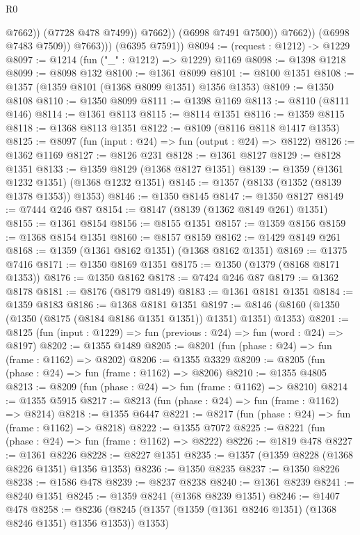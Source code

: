 \begin{lexlean}{R0}
\begin{coremodule}
                              @7662))
                          (@7728 @478 @7499))
                        @7662))
                    (@6998 @7491 @7500))
                  @7662))
              (@6998 @7483 @7509))
            @7663)))
      (@6395 @7591))
@8094 := (request : @1212) -> @1229
@8097 := @1214 (fun ("_" : @1212) => @1229) @1169
@8098 := @1398 @1218
@8099 := @8098 @132
@8100 := @1361 @8099
@8101 := @8100 @1351
@8108 := @1357 (@1359 @8101 (@1368 @8099 @1351) @1356 @1353)
@8109 := @1350 @8108
@8110 := @1350 @8099
@8111 := @1398 @1169
@8113 := @8110 (@8111 @146)
@8114 := @1361 @8113
@8115 := @8114 @1351
@8116 := @1359 @8115
@8118 := @1368 @8113 @1351
@8122 := @8109 (@8116 @8118 @1417 @1353)
@8125 := @8097 (fun (input : @24) => fun (output : @24) => @8122)
@8126 := @1362 @1169
@8127 := @8126 @231
@8128 := @1361 @8127
@8129 := @8128 @1351
@8133 := @1359 @8129 (@1368 @8127 @1351)
@8139 := @1359 (@1361 @1232 @1351) (@1368 @1232 @1351)
@8145 := @1357 (@8133 (@1352 (@8139 @1378 @1353)) @1353)
@8146 := @1350 @8145
@8147 := @1350 @8127
@8149 := @7444 @246 @87
@8154 := @8147 (@8139 (@1362 @8149 @261) @1351)
@8155 := @1361 @8154
@8156 := @8155 @1351
@8157 := @1359 @8156
@8159 := @1368 @8154 @1351
@8160 := @8157 @8159
@8162 := @1429 @8149 @261
@8168 := @1359 (@1361 @8162 @1351) (@1368 @8162 @1351)
@8169 := @1375 @7416
@8171 := @1350 @8169 @1351
@8175 := @1350 (@1379 (@8168 @8171 @1353))
@8176 := @1350 @8162
@8178 := @7424 @246 @87
@8179 := @1362 @8178
@8181 := @8176 (@8179 @8149)
@8183 := @1361 @8181 @1351
@8184 := @1359 @8183
@8186 := @1368 @8181 @1351
@8197 := @8146 (@8160 (@1350 (@1350 (@8175 (@8184 @8186 @1351 @1351)) @1351) @1351) @1353)
@8201 := @8125 (fun (input : @1229) => fun (previous : @24) => fun (word : @24) => @8197)
@8202 := @1355 @1489
@8205 := @8201 (fun (phase : @24) => fun (frame : @1162) => @8202)
@8206 := @1355 @3329
@8209 := @8205 (fun (phase : @24) => fun (frame : @1162) => @8206)
@8210 := @1355 @4805
@8213 := @8209 (fun (phase : @24) => fun (frame : @1162) => @8210)
@8214 := @1355 @5915
@8217 := @8213 (fun (phase : @24) => fun (frame : @1162) => @8214)
@8218 := @1355 @6447
@8221 := @8217 (fun (phase : @24) => fun (frame : @1162) => @8218)
@8222 := @1355 @7072
@8225 := @8221 (fun (phase : @24) => fun (frame : @1162) => @8222)
@8226 := @1819 @478
@8227 := @1361 @8226
@8228 := @8227 @1351
@8235 := @1357 (@1359 @8228 (@1368 @8226 @1351) @1356 @1353)
@8236 := @1350 @8235
@8237 := @1350 @8226
@8238 := @1586 @478
@8239 := @8237 @8238
@8240 := @1361 @8239
@8241 := @8240 @1351
@8245 := @1359 @8241 (@1368 @8239 @1351)
@8246 := @1407 @478
@8258 := @8236 (@8245 (@1357 (@1359 (@1361 @8246 @1351) (@1368 @8246 @1351) @1356 @1353)) @1353)

\end{coremodule}
\end{lexlean}
